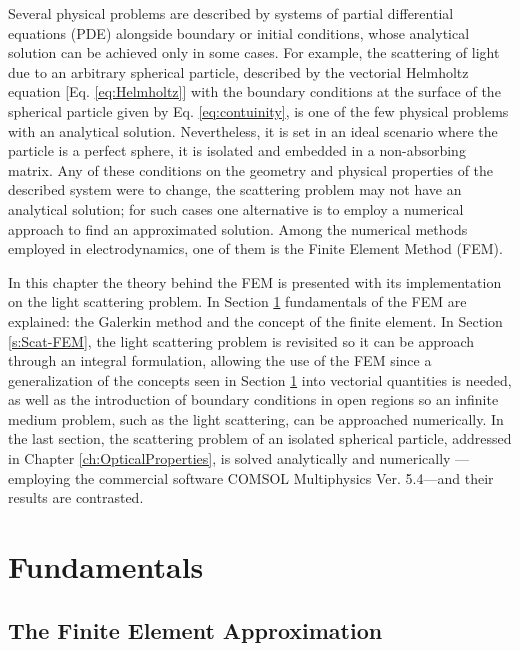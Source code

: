 \documentclass[11pt]{Latex/Classes/PhDthesisPSnPDF}
\begin{document}
    Several physical problems are described by systems of partial differential equations (PDE) alongside boundary or initial conditions, whose analytical solution can be achieved only in some cases. For example, the scattering of light due to an arbitrary spherical particle, described by the vectorial Helmholtz equation [Eq. \eqref{eq:Helmholtz}] with the boundary conditions at the surface of the spherical particle given by Eq. \eqref{eq:contuinity},   is one of the few physical problems with an analytical solution. Nevertheless, it is set in an ideal scenario where the particle is a perfect sphere, it is isolated and embedded in a non-absorbing matrix. Any of  these conditions on the geometry and physical properties of the described system were to change, the scattering problem may not have an analytical solution;  for such cases one alternative is to employ a numerical approach to find an approximated solution.  Among the numerical methods employed in electrodynamics, one of them is the Finite Element Method (FEM).

    In this chapter the theory behind the FEM is presented with its implementation on the light scattering problem. In Section \ref{s:FEM-Fund} fundamentals of the FEM are explained: the Galerkin method and the concept of the finite element. In Section \ref{s:Scat-FEM}, the light scattering problem is revisited so it can be approach through an integral formulation, allowing the use of the FEM since a generalization of the concepts seen in Section \ref{s:FEM-Fund}  into vectorial quantities is needed, as well as the introduction of boundary conditions in open regions so an infinite medium problem, such as the light scattering, can be approached numerically. In the last section, the scattering problem of an isolated spherical particle, addressed in Chapter \ref{ch:OpticalProperties}, is solved analytically and numerically ---employing the commercial software COMSOL Multiphysics\texttrademark{} Ver. 5.4---and their results are contrasted.

    \section{Fundamentals}
     \label{s:FEM-Fund}
     

        \subsection{The Finite Element Approximation}
         \label{ss:FEM-FE}
         
\end{document}
